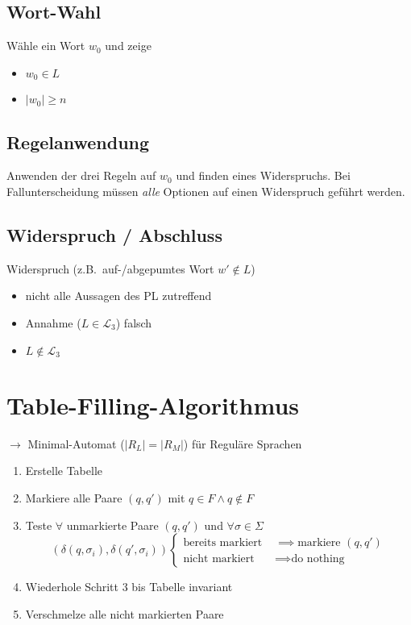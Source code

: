 \documentclass[a4paper,parskip=half,footsepline=on,headings=normal,titlepage=false]{scrartcl}
\begin{document}
\subsection{Wort-Wahl}
Wähle ein Wort $w_0$ und zeige 
\begin{itemize}
    \item $w_0 \in L$
    \item $|w_0| \ge n$
\end{itemize}

\subsection{Regelanwendung}
Anwenden der drei Regeln auf $w_0$ und finden eines Widerspruchs.
Bei Fallunterscheidung müssen \emph{alle} Optionen auf einen Widerspruch geführt werden.

\subsection{Widerspruch / Abschluss}
Widerspruch (z.B.\ auf-/abgepumtes Wort $w' \notin L$)
\begin{itemize}[leftmargin=2.0cm,label=$\implies$]
    \item nicht alle Aussagen des \ac{PL} zutreffend
    \item Annahme ($L \in \mathcal{L}_3$) falsch
    \item $L \notin \mathcal{L}_3$
\end{itemize}

\section{Table-Filling-Algorithmus}
$\rightarrow$ Minimal-Automat ($|R_L| = |R_M|$) für Reguläre Sprachen

\begin{enumerate}
    \item Erstelle Tabelle
    \item Markiere alle Paare $(q, q')$ mit $q\in F \wedge q\notin F$
    \item Teste $\forall$ unmarkierte Paare $(q, q')$ und $\forall \sigma \in \Sigma$
    \[
     (\delta(q,\sigma_i), \delta(q',\sigma_i))
      \begin{cases} 
       \text{bereits markiert } & \implies \text{markiere } (q, q') \\
       \text{nicht markiert } & \implies \text{do nothing}
      \end{cases}
    \]
    \item Wiederhole Schritt 3 bis Tabelle invariant
    \item Verschmelze alle nicht markierten Paare
\end{enumerate}
\end{document}
